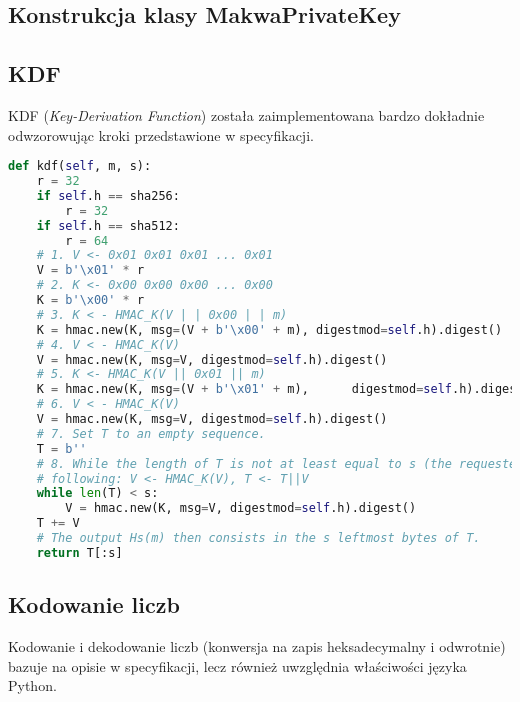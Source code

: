 \documentclass[a4paper,titleauthor]{mwart}
\begin{document}
\subsection{Konstrukcja klasy MakwaPrivateKey}
\subsection{KDF}
KDF (\textit{Key-Derivation Function}) została zaimplementowana bardzo dokładnie odwzorowując kroki przedstawione w specyfikacji.
\begin{lstlisting}[language=Python]
def kdf(self, m, s):
	r = 32
	if self.h == sha256:
		r = 32
	if self.h == sha512:
		r = 64
	# 1. V <- 0x01 0x01 0x01 ... 0x01
	V = b'\x01' * r
	# 2. K <- 0x00 0x00 0x00 ... 0x00
	K = b'\x00' * r
	# 3. K < - HMAC_K(V | | 0x00 | | m)
	K = hmac.new(K, msg=(V + b'\x00' + m), digestmod=self.h).digest()
	# 4. V < - HMAC_K(V)
	V = hmac.new(K, msg=V, digestmod=self.h).digest()
	# 5. K <- HMAC_K(V || 0x01 || m)
	K = hmac.new(K, msg=(V + b'\x01' + m), 		digestmod=self.h).digest()
	# 6. V < - HMAC_K(V)
	V = hmac.new(K, msg=V, digestmod=self.h).digest()
	# 7. Set T to an empty sequence.
	T = b''
	# 8. While the length of T is not at least equal to s (the requested output length), do the
	# following: V <- HMAC_K(V), T <- T||V
	while len(T) < s:
		V = hmac.new(K, msg=V, digestmod=self.h).digest()
	T += V
	# The output Hs(m) then consists in the s leftmost bytes of T.
	return T[:s]
\end{lstlisting}
\subsection{Kodowanie liczb}
Kodowanie i dekodowanie liczb (konwersja na zapis heksadecymalny i odwrotnie) bazuje na opisie w specyfikacji, lecz również uwzględnia właściwości języka Python.
\end{document}
